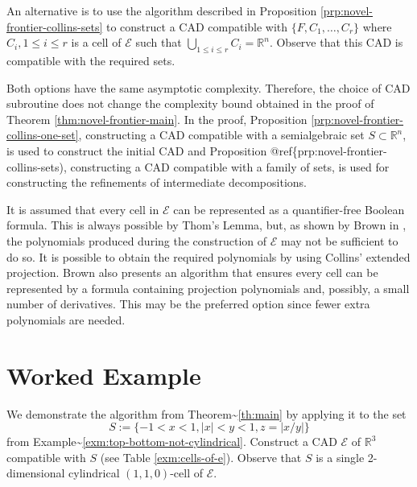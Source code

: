 \documentclass[
]{book}
\theoremstyle{definition}
\theoremstyle{definition}
\theoremstyle{definition}
\theoremstyle{definition}
\theoremstyle{remark}
\begin{document}
An alternative is to use the algorithm described in Proposition \ref{prp:novel-frontier-collins-sets} to construct a CAD compatible with \(\{F, C_1,\ldots,C_r\}\) where \(C_i,1\le i \le r\) is a cell of \(\mathcal{E}\) such that \(\bigcup_{1\le i \le r} C_i = \mathbb{R}^n\). Observe that this CAD is compatible with the required sets.

Both options have the same asymptotic complexity. Therefore, the choice of CAD subroutine does not change the complexity bound obtained in the proof of Theorem \ref{thm:novel-frontier-main}. In the proof, Proposition \ref{prp:novel-frontier-collins-one-set}, constructing a CAD compatible with a semialgebraic set \(S\subset \mathbb{R}^n\), is used to construct the initial CAD and Proposition @ref\{prp:novel-frontier-collins-sets), constructing a CAD compatible with a family of sets, is used for constructing the refinements of intermediate decompositions.

It is assumed that every cell in \(\mathcal{E}\) can be represented as a quantifier-free Boolean formula. This is always possible by Thom's Lemma, but, as shown by Brown in \citet{brown99}, the polynomials produced during the construction of \(\mathcal{E}\) may not be sufficient to do so. It is possible to obtain the required polynomials by using Collins' extended projection. Brown \citet{brown99} also presents an algorithm that ensures every cell can be represented by a formula containing projection polynomials and, possibly, a small number of derivatives. This may be the preferred option since fewer extra polynomials are needed.

\hypertarget{sec:novel-frontier-worked-example}{%
\section{Worked Example}\label{sec:novel-frontier-worked-example}}

We demonstrate the algorithm from Theorem\textasciitilde{}\ref{th:main} by applying it to the set
\[
S := \{ -1 < x < 1, \vert x\vert <y <1, z=\vert x/y\vert \}
\]
from Example\textasciitilde{}\ref{exm:top-bottom-not-cylindrical}. Construct a CAD \(\mathcal{E}\) of \(\mathbb{R}^3\) compatible with \(S\) (see Table \ref{exm:cells-of-e}). Observe that \(S\) is a single 2-dimensional cylindrical \((1,1,0)\)-cell of \(\mathcal{E}\).
\end{document}
